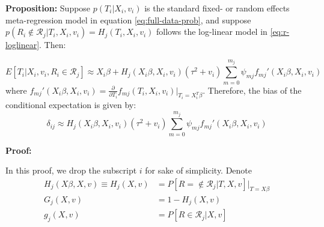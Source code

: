 \documentclass[
]{article}
\begin{document}
\textbf{Proposition:} Suppose \(p(T_i | X_i, v_i)\) is the standard fixed- or random effects meta-regression model in equation \eqref{eq:full-data-prob}, and suppose \(p(R_i \not\in \mathcal{R}_j | T_i, X_i, v_i) = H_j(T_i, X_i, v_i)\) follows the log-linear model in \eqref{eq:r-loglinear}. Then:

\begin{equation}
E[T_i | X_i, v_i, R_i \in \mathcal{R}_j] \approx X_i\beta + H_j(X_i\beta, X_i, v_i)(\tau^2 + v_i)\sum_{m = 0}^{m_j} \psi_{mj} f_{mj}'(X_i \beta, X_i, v_i)
\label{eq:conditional_expectation}
\end{equation}
where \(f_{mj}'(X_i \beta, X_i, v_i) = \frac{\partial}{\partial T_i} f_{mj}(T_i, X_i, v_i)\rvert_{T_i = X_i^T \beta}\).
Therefore, the bias of the conditional expectation is given by:
\begin{equation}
\delta_{ij} \approx H_j(X_i \beta, X_i, v_i)(\tau^2 + v_i)\sum_{m = 0}^{m_j} \psi_{mj} f_{mj}'(X_i \beta, X_i, v_i)
\label{eq:conditional-bias-appendix}
\end{equation}

\textbf{Proof:}

In this proof, we drop the subscript \(i\) for sake of simplicity.
Denote
\begin{align*}
H_j(X\beta, X, v) \equiv H_j(X, v) 
  & = P[R =\not\in \mathcal{R}_j | T, X, v] \rvert_{T = X\beta} \\
G_j(X, v) 
  & = 1 - H_j(X, v) \\
g_j(X, v)
  & = P[R \in \mathcal{R}_j | X, v]
\end{align*}
\end{document}
